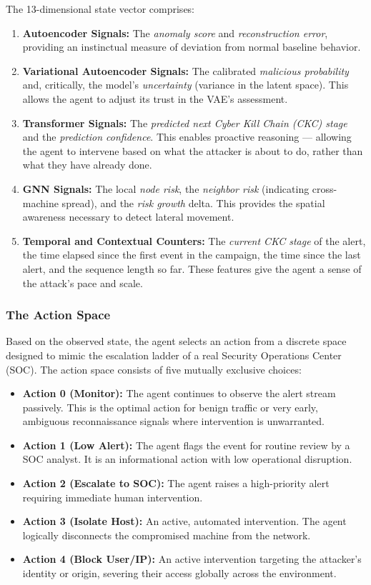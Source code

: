 The 13-dimensional state vector comprises:
\begin{enumerate}
    \item \textbf{Autoencoder Signals:} The \textit{anomaly score} and \textit{reconstruction error}, providing an instinctual measure of deviation from normal baseline behavior.
    \item \textbf{Variational Autoencoder Signals:} The calibrated \textit{malicious probability} and, critically, the model's \textit{uncertainty} (variance in the latent space). This allows the agent to adjust its trust in the VAE's assessment.
    \item \textbf{Transformer Signals:} The \textit{predicted next Cyber Kill Chain (CKC) stage} and the \textit{prediction confidence}. This enables proactive reasoning --- allowing the agent to intervene based on what the attacker is about to do, rather than what they have already done.
    \item \textbf{GNN Signals:} The local \textit{node risk}, the \textit{neighbor risk} (indicating cross-machine spread), and the \textit{risk growth} delta. This provides the spatial awareness necessary to detect lateral movement.
    \item \textbf{Temporal and Contextual Counters:} The \textit{current CKC stage} of the alert, the time elapsed since the first event in the campaign, the time since the last alert, and the sequence length so far. These features give the agent a sense of the attack's pace and scale.
\end{enumerate}

\subsubsection{The Action Space}

Based on the observed state, the agent selects an action from a discrete space designed to mimic the escalation ladder of a real Security Operations Center (SOC). The action space consists of five mutually exclusive choices:

\begin{itemize}
    \item \textbf{Action 0 (Monitor):} The agent continues to observe the alert stream passively. This is the optimal action for benign traffic or very early, ambiguous reconnaissance signals where intervention is unwarranted.
    \item \textbf{Action 1 (Low Alert):} The agent flags the event for routine review by a SOC analyst. It is an informational action with low operational disruption.
    \item \textbf{Action 2 (Escalate to SOC):} The agent raises a high-priority alert requiring immediate human intervention.
    \item \textbf{Action 3 (Isolate Host):} An active, automated intervention. The agent logically disconnects the compromised machine from the network.
    \item \textbf{Action 4 (Block User/IP):} An active intervention targeting the attacker's identity or origin, severing their access globally across the environment.
\end{itemize}

